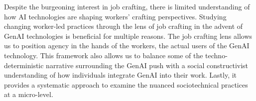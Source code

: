 Despite the burgeoning interest in job crafting, there is limited understanding of how AI technologies are shaping workers' crafting perspectives. Studying changing worker-led practices through the lens of job crafting in the advent of GenAI technologies is beneficial for multiple reasons. The job crafting lens allows us to position agency in the hands of the workers, the actual users of the GenAI technology. This framework also allows us to balance some of the techno-deterministic narrative surrounding the GenAI push with a social constructivist understanding of how individuals integrate GenAI into their work. Lastly, it provides a systematic approach to examine the nuanced sociotechnical practices at a micro-level.  

